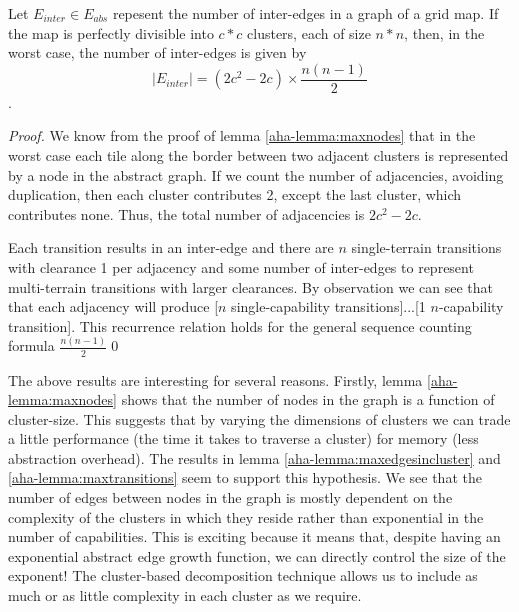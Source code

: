 \begin{lemma}
\label{aha-lemma:maxtransitions}
Let $E_{inter} \in E_{abs}$ repesent the number of inter-edges in a graph of a grid map. If the map is perfectly divisible into $c*c$ clusters, each of size $n*n$, then, in the worst case, the number of inter-edges is given by 
$$|E_{inter}| = (2c^2 - 2c)\times \frac{n(n-1)}{2}$$.
\end{lemma}

\begin{proof}
We know from the proof of lemma \ref{aha-lemma:maxnodes} that in the worst case each tile along the border between two adjacent clusters is represented by a node in the abstract graph. 
If we count the number of adjacencies, avoiding duplication, then each cluster contributes 2, except the last cluster, which contributes none. 
Thus, the total number of adjacencies is $2c^2 - 2c$.  
\par \indent
Each transition results in an inter-edge and there are $n$ single-terrain transitions with clearance 1 per adjacency and some number of inter-edges to represent multi-terrain transitions with larger clearances. 
By observation we can see that that each adjacency will produce [$n$ single-capability transitions]...[1 $n$-capability transition]. 
This recurrence relation holds for the general sequence counting formula $\frac{n(n-1)}{2}$\qed
\end{proof}

The above results are interesting for several reasons. 
Firstly, lemma \ref{aha-lemma:maxnodes} shows that the number of nodes in the graph is a function of cluster-size. This suggests that by varying the dimensions of clusters we can trade a little performance (the time it takes to traverse a cluster) for memory (less abstraction overhead).
The results in lemma \ref{aha-lemma:maxedgesincluster} and \ref{aha-lemma:maxtransitions} seem to support this hypothesis. 
We see that the number of edges between nodes in the graph is mostly dependent on the complexity of the clusters in which they reside rather than exponential in the number of capabilities. 
This is exciting because it means that, despite having an exponential abstract edge growth function, we can directly control the size of the exponent! 
The cluster-based decomposition technique allows us to include as much or as little complexity in each cluster as we require.
